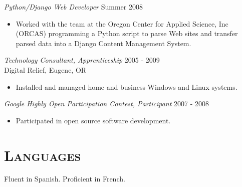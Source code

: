 \documentclass[margin]{res}
\begin{document}
\begin{resume}
    {\sl Python/Django Web Developer} \hfill  Summer 2008
    \begin{itemize}  \itemsep -2pt %
        \item Worked with the team at the Oregon Center for Applied Science, Inc (ORCAS) programming a Python script to parse Web sites and transfer parsed data into a Django Content Management System.
    \end{itemize}

    {\sl Technology Consultant, Apprenticeship} \hfill 2005 - 2009 \\
    Digital Relief, Eugene, OR
    \begin{itemize}  \itemsep -2pt %
        \item Installed and managed home and business Windows and Linux systems.
    \end{itemize}

    {\sl Google Highly Open Participation Contest, Participant} \hfill 2007 - 2008
    \begin{itemize}  \itemsep -2pt %
        \item Participated in open source software development.
    \end{itemize}

\section{\textsc{Languages}} Fluent in Spanish. Proficient in French.

\end{resume}
\end{document}

